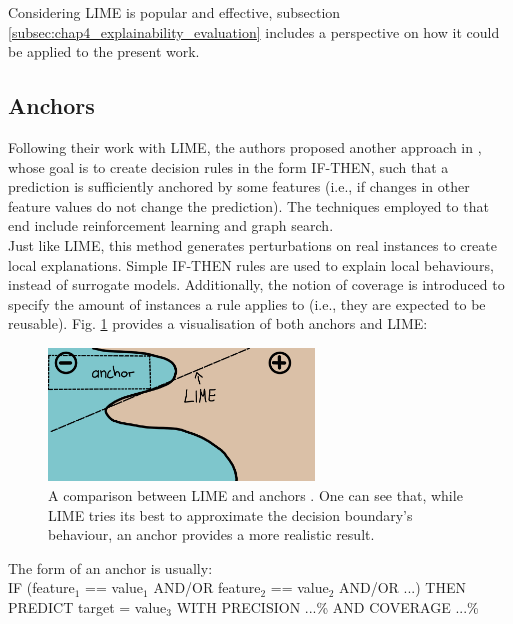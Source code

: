 Considering \ac{LIME} is popular and effective, subsection \ref{subsec:chap4_explainability_evaluation} includes a perspective on how it could be applied to the present work.

\subsection{Anchors}
\label{subsec:chap2_anchors}
Following their work with \ac{LIME}, the authors proposed another approach in \cite{anchors}, whose goal is to create decision rules in the form IF-THEN, such that a prediction is sufficiently anchored by some features (i.e., if changes in other feature values do not change the prediction). The techniques employed to that end include reinforcement learning and graph search.\\

Just like \ac{LIME}, this method generates perturbations on real instances to create local explanations. Simple IF-THEN rules are used to explain local behaviours, instead of surrogate models. Additionally, the notion of coverage is introduced to specify the amount of instances a rule applies to (i.e., they are expected to be reusable). Fig. \ref{fig:anchors_1} provides a visualisation of both anchors and \ac{LIME}:

\begin{figure}[H]
\centering
\includegraphics[width=200pt]{figures/figure_23.pdf}
\caption{A comparison between \ac{LIME} and anchors \cite{anchors}. One can see that, while \ac{LIME} tries its best to approximate the decision boundary's behaviour, an anchor provides a more realistic result.}
\label{fig:anchors_1}
\end{figure}

The form of an anchor is usually:\\

IF (feature$_{1}$ == value$_{1}$ AND/OR feature$_{2}$ == value$_{2}$ AND/OR ...) THEN \newline
PREDICT target = value$_{3}$ \newline
WITH PRECISION ...\% AND COVERAGE ...\%\\


